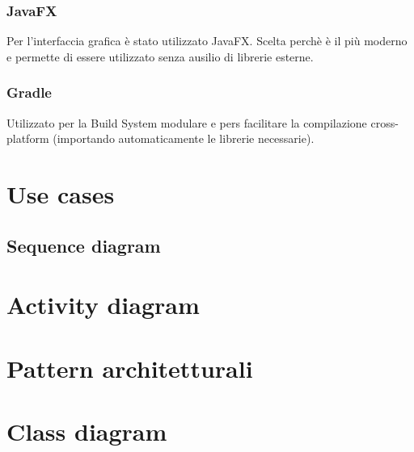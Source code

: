 \documentclass[12pt, a4paper]{article}
\numberwithin{equation}{section} %
\begin{document}
\subsubsection{JavaFX}
Per l'interfaccia grafica è stato utilizzato JavaFX. Scelta perchè è il più moderno e permette di essere utilizzato senza ausilio di librerie esterne.
\subsubsection{Gradle}
Utilizzato per la Build System modulare e pers facilitare la compilazione cross-platform (importando automaticamente le librerie necessarie).

\section{Use cases}


\subsection{Sequence diagram}


\section{Activity diagram}


\section{Pattern architetturali}


\section{Class diagram}





\end{document}

